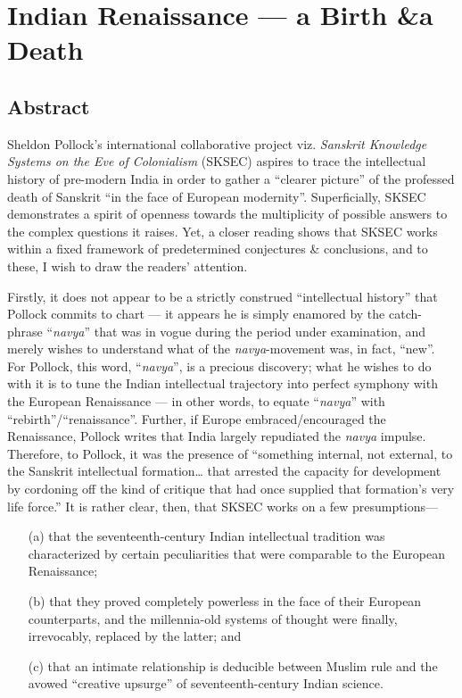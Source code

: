 \chapter[Indian Renaissance — a Birth \& a Death]{Indian Renaissance — a Birth \&\break a Death}\label{chapter\thechapter:begin}

\section*{Abstract}

Sheldon Pollock’s international collaborative project viz. {\sl Sanskrit Knowledge Systems on the Eve of Colonialism} (SKSEC) aspires to trace the intellectual history of pre-modern India in order to gather a “clearer picture” of the professed death of Sanskrit “in the face of European modernity”. Superficially, SKSEC demonstrates a spirit of openness towards the multiplicity of possible answers to the complex questions it raises. Yet, a closer reading shows that SKSEC works within a fixed framework of predetermined conjectures \& conclusions, and to these, I wish to draw the readers’ attention. 

Firstly, it does not appear to be a strictly construed “intellectual history” that Pollock commits to chart — it appears he is simply enamored by the catch-phrase “{\sl navya}” that was in vogue during the period under examination, and merely wishes to understand what of the {\sl navya}-movement was, in fact, “new”. For Pollock, this word, “{\sl navya}”, is a precious discovery; what he wishes to do with it is to tune the Indian intellectual trajectory into perfect symphony with the European Renaissance — in other words, to equate “{\sl navya}” with “rebirth”/“renaissance”. Further, if Europe embraced/encouraged the Renaissance, Pollock writes that India largely repudiated the {\sl navya} impulse. Therefore, to Pollock, it was the presence of “something internal, not external, to the Sanskrit intellectual formation… that arrested the capacity for development by cordoning off the kind of critique that had once supplied that formation’s very life force.”
It is rather clear, then, that SKSEC works on a few presumptions—   
\begin{itemize}
\itemsep=1pt
\item[(a)] that the seventeenth-century Indian intellectual tradition was characterized by certain peculiarities that were comparable to the European Renaissance;

\item[(b)] that they proved completely powerless in the face of their European counterparts, and the millennia-old systems of thought were finally, irrevocably, replaced by the latter; and 

\item[(c)] that an intimate relationship is deducible between Muslim rule and the avowed “creative upsurge” of seventeenth-century Indian science.
\end{itemize}

